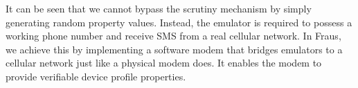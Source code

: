 \documentclass[conference]{IEEEtranl}
\begin{document}
	It can be seen that we cannot bypass the scrutiny mechanism by simply generating random property values. Instead, the emulator is required to possess a working phone number and receive SMS from a real cellular network. In Fraus, we achieve this by implementing a software modem that bridges emulators to a cellular network just like a physical modem does. It enables the modem to provide verifiable device profile properties.








\end{document}
